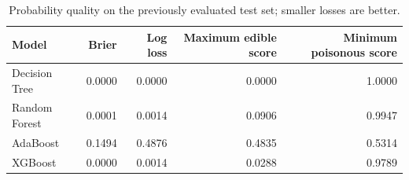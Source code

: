\begin{table}[H]
\centering\small
\caption{Probability quality on the previously evaluated test set; smaller losses are better.}
\begin{tabular}{lrrrr}
\toprule
Model & Brier & Log loss & Maximum edible score & Minimum poisonous score \\
\midrule
Decision Tree & 0.0000 & 0.0000 & 0.0000 & 1.0000 \\
Random Forest & 0.0001 & 0.0014 & 0.0906 & 0.9947 \\
AdaBoost & 0.1494 & 0.4876 & 0.4835 & 0.5314 \\
XGBoost & 0.0000 & 0.0014 & 0.0288 & 0.9789 \\
\bottomrule
\end{tabular}
\end{table}

